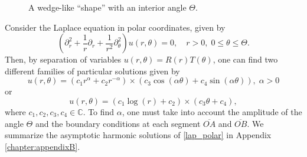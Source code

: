 \begin{figure}[H]
\centering
{}
\caption{A wedge-like ``shape'' with an interior angle \(\Theta\).}\label{wedge}
\end{figure}
Consider the Laplace equation in polar coordinates, given by
\begin{equation}\label{lap_polar}
    \left(\partial_r^2 + \frac{1}{r} \partial_r +\frac{1}{r^2}\partial_\theta^2\right)u(r,\theta) = 0, \quad r>0, \; 0 \leq \theta \leq \Theta.
\end{equation}
Then, by separation of variables \(u(r, \theta) = R(r) T(\theta)\), one can find two different families of particular solutions given by
\[
    u(r,\theta) = \left(c_1 r^\alpha + c_2 r^{-\alpha}\right) \times \left(c_3 \cos(\alpha \theta) + c_4 \sin(\alpha \theta)\right), \; \alpha >0
\]
or
\[
    u(r,\theta) = \left(c_1 \log (r) + c_2 \right) \times \left(c_3 \theta + c_4 \right),
\]
where \(c_1, c_2, c_3, c_4 \in \mathbb{C}\). To find \(\alpha\), one must take into account the amplitude of the angle \(\Theta\) and the boundary conditions at each segment \(\overline{OA}\) and \(\overline{OB}\). We summarize the asymptotic harmonic solutions of \eqref{lap_polar} in Appendix \ref{chapter:appendixB}.
